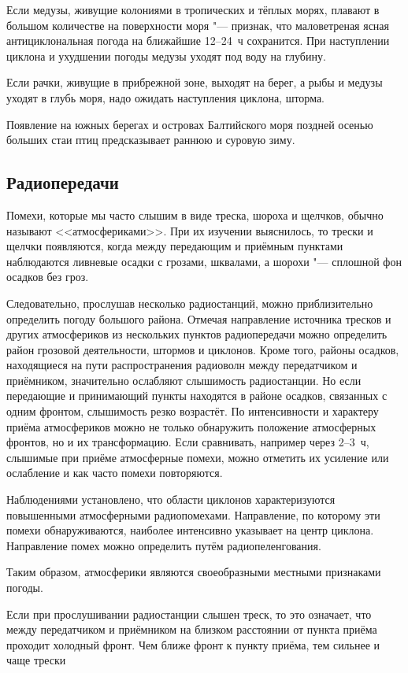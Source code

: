  Если медузы, живущие колониями в тропических и тёплых морях,
плавают в большом количестве на поверхности моря "--- признак, что
маловетреная ясная антициклональная погода на ближайшие 12--24~ч
сохранится. При наступлении циклона и ухудшении погоды медузы уходят
под воду на глубину.

 Если рачки, живущие в прибрежной зоне, выходят на берег, а рыбы и
медузы уходят в глубь моря, надо ожидать наступления циклона, шторма.

 Появление на южных берегах и островах Балтийского моря поздней
осенью больших стаи птиц предсказывает раннюю и суровую зиму.

\subsection{Радиопередачи}

Помехи, которые мы часто слышим в виде треска, шороха и щелчков,
обычно называют <<атмосфериками>>. При их изучении выяснилось, то трески
и щелчки появляются, когда между передающим и приёмным пунктами
наблюдаются ливневые осадки с грозами, шквалами, а шорохи "---
сплошной фон осадков без гроз.

Следовательно, прослушав несколько радиостанций, можно приблизительно
определить погоду большого района. Отмечая направление источника
тресков и других атмосфериков из нескольких пунктов радиопередачи
можно определить район грозовой деятельности, штормов и
циклонов. Кроме того, районы осадков, находящиеся на пути
распространения радиоволн между передатчиком и приёмником, значительно
ослабляют слышимость радиостанции. Но если передающие и принимающий
пункты находятся в районе осадков, связанных с одним фронтом,
слышимость резко возрастёт. По интенсивности и характеру приёма
атмосфериков можно не только обнаружить положение атмосферных фронтов,
но и их трансформацию. Если сравнивать, например через 2--3~ч,
слышимые при приёме атмосферные помехи, можно отметить их усиление или
ослабление и как часто помехи повторяются.

Наблюдениями установлено, что области циклонов характеризуются
повышенными атмосферными радиопомехами. Направление, по которому эти
помехи обнаруживаются, наиболее интенсивно указывает на центр
циклона. Направление помех можно определить путём радиопеленгования.

Таким образом, атмосферики являются своеобразными местными признаками
погоды.

 Если при прослушивании радиостанции слышен треск, то это
означает, что между передатчиком и приёмником на близком расстоянии от
пункта приёма проходит холодный фронт. Чем ближе фронт к пункту
приёма, тем сильнее и чаще трески

